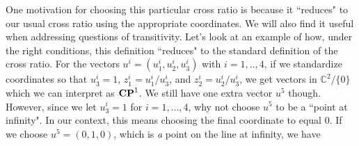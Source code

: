 \documentclass{amsart}
\theoremstyle{theorem}
\theoremstyle{lemma}
\theoremstyle{definition}
\begin{document}
One motivation for choosing this particular cross ratio is because it ``reduces" to our usual cross ratio using the appropriate coordinates. We will also find it useful when addressing questions of transitivity. Let's look at an example of how, under the right conditions, this definition ``reduces" to the standard definition of the cross ratio. For the vectors $u^i=(u^i_1, u^i_2, u^i_3)$ with $i=1,..,4$, if we standardize coordinates so that $u^i_3=1$, $z^i_1=u^i_1/u^i_3$, and $z^i_2= u^i_2/u^i_3$, we get vectors in $\mathbb{C}^2/\{0\}$ which we can interpret as ${\bf CP}^1$. We still have one extra vector $u^5$ though. However, since we let $u^i_3=1$ for $i=1,...,4$, why not choose $u^5$ to be a ``point at infinity". In our context, this means choosing the final coordinate to equal $0$. If we choose $u^5=(0,1,0)$, which is {\it a} point on the line at infinity, we have
\end{document}
